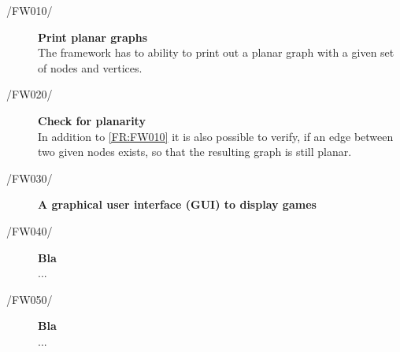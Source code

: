 \vspace{1cm}

\begin{description}
  	\item[/FW010/\label{FR:FW010}] {\bf Print planar graphs}  \hfill \\
  	The framework has to ability to print out a planar graph with a given set of nodes and vertices.
 	\item[/FW020/\label{FR:FW020}] {\bf Check for planarity}  \\
 	In addition to \ref{FR:FW010} it is also possible to verify, if an edge between two given nodes exists, so that the resulting graph is still planar.
	\item[/FW030/\label{FR:FW030}] {\bf A graphical user interface (GUI) to display games}  \\
  	
	\item[/FW040/\label{FR:FW040}] {\bf Bla}  \\
	...
	\item[/FW050/\label{FR:FW050}] {\bf Bla}  \\
	...
	\begin{comment}
	\item[/FW060/\label{FR:FW060}] {\bf Bla}  \\
	...
	\item[/FW070/\label{FR:FW070}] {\bf Bla}  \\
	...
	\item[/FW080/\label{FR:FW080}] {\bf Bla}  \\
	...
	\item[/FW090/\label{FR:FW090}] {\bf Bla}  \\
	...
	\item[/FW100/\label{FR:FW100}] {\bf Bla}  \\
	...
	\item[/FW110/\label{FR:FW110}] {\bf Bla}  \\
	...
	\item[/FW120/\label{FR:FW120}] {\bf Bla}  \\
	...
	\item[/FW130/\label{FR:FW130}] {\bf Bla}  \\
	...
	\item[/FW140/\label{FR:FW140}] {\bf Bla}  \\
	...
	\item[/FW150/\label{FR:FW150}] {\bf Bla}  \hfill \\
	...
	\end{comment}
\end{description}

